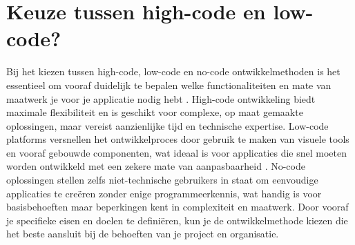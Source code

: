 \section{Keuze tussen high-code en low-code?}
Bij het kiezen tussen high-code, low-code en no-code ontwikkelmethoden is het essentieel om vooraf duidelijk te bepalen welke functionaliteiten en mate van maatwerk je voor je applicatie nodig hebt \autocite{Ballejos2024}. High-code ontwikkeling biedt maximale flexibiliteit en is geschikt voor complexe, op maat gemaakte oplossingen, maar vereist aanzienlijke tijd en technische expertise. Low-code platforms versnellen het ontwikkelproces door gebruik te maken van visuele tools en vooraf gebouwde componenten, wat ideaal is voor applicaties die snel moeten worden ontwikkeld met een zekere mate van aanpasbaarheid \autocite{Ballejos2024}. No-code oplossingen stellen zelfs niet-technische gebruikers in staat om eenvoudige applicaties te creëren zonder enige programmeerkennis, wat handig is voor basisbehoeften maar beperkingen kent in complexiteit en maatwerk. Door vooraf je specifieke eisen en doelen te definiëren, kun je de ontwikkelmethode kiezen die het beste aansluit bij de behoeften van je project en organisatie.

